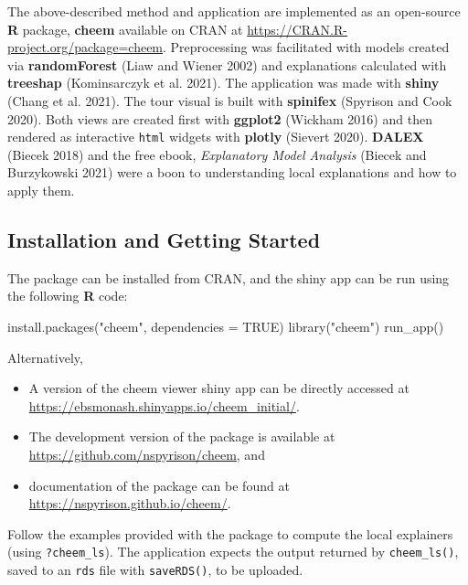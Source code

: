 \documentclass[11pt,twoside]{article}
\newenvironment{Shaded}{\begin{snugshade}}{\end{snugshade}}
\newcommand{\AttributeTok}[1]{\textcolor[rgb]{0.77,0.63,0.00}{#1}}
\newcommand{\ConstantTok}[1]{\textcolor[rgb]{0.00,0.00,0.00}{#1}}
\newcommand{\FunctionTok}[1]{\textcolor[rgb]{0.00,0.00,0.00}{#1}}
\newcommand{\NormalTok}[1]{#1}
\newcommand{\StringTok}[1]{\textcolor[rgb]{0.31,0.60,0.02}{#1}}
\providecommand{\tightlist}{%
  \setlength{\itemsep}{0pt}\setlength{\parskip}{0pt}}
\begin{document}
The above-described method and application are implemented as an open-source \textbf{R} package, \textbf{cheem} available on CRAN at \url{https://CRAN.R-project.org/package=cheem}. Preprocessing was facilitated with models created via \textbf{randomForest} (Liaw and Wiener 2002) and explanations calculated with \textbf{treeshap} (Kominsarczyk et al. 2021). The application was made with \textbf{shiny} (Chang et al. 2021). The tour visual is built with \textbf{spinifex} (Spyrison and Cook 2020). Both views are created first with \textbf{ggplot2} (Wickham 2016) and then rendered as interactive \texttt{html} widgets with \textbf{plotly} (Sievert 2020). \textbf{DALEX} (Biecek 2018) and the free ebook, \emph{Explanatory Model Analysis} (Biecek and Burzykowski 2021) were a boon to understanding local explanations and how to apply them.

\hypertarget{installation-and-getting-started}{%
\subsection{Installation and Getting Started}\label{installation-and-getting-started}}

The package can be installed from CRAN, and the shiny app can be run using the following \textbf{R} code:

\begin{Shaded}
\begin{Highlighting}[]
\FunctionTok{install.packages}\NormalTok{(}\StringTok{"cheem"}\NormalTok{, }\AttributeTok{dependencies =} \ConstantTok{TRUE}\NormalTok{)}
\FunctionTok{library}\NormalTok{(}\StringTok{"cheem"}\NormalTok{)}
\FunctionTok{run\_app}\NormalTok{()}
\end{Highlighting}
\end{Shaded}

Alternatively,

\begin{itemize}
\tightlist
\item
  A version of the cheem viewer shiny app can be directly accessed at
  \url{https://ebsmonash.shinyapps.io/cheem_initial/}.
\item
  The development version of the package is available at \url{https://github.com/nspyrison/cheem}, and
\item
  documentation of the package can be found at \url{https://nspyrison.github.io/cheem/}.
\end{itemize}

Follow the examples provided with the package to compute the local explainers (using \texttt{?cheem\_ls}). The application expects the output returned by \texttt{cheem\_ls()}, saved to an \texttt{rds} file with \texttt{saveRDS()}, to be uploaded.
\end{document}

